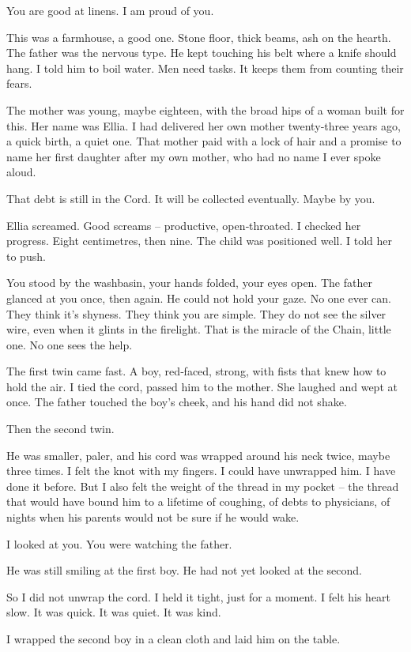 \documentclass[10pt,twoside]{book}
\begin{document}
You are good at linens. I am proud of you.

This was a farmhouse, a good one. Stone floor, thick beams, ash on the hearth. The father was the nervous type. He kept touching his belt where a knife should hang. I told him to boil water. Men need tasks. It keeps them from counting their fears.

The mother was young, maybe eighteen, with the broad hips of a woman built for this. Her name was Ellia. I had delivered her own mother twenty‑three years ago, a quick birth, a quiet one. That mother paid with a lock of hair and a promise to name her first daughter after my own mother, who had no name I ever spoke aloud.

That debt is still in the Cord. It will be collected eventually. Maybe by you.

Ellia screamed. Good screams – productive, open‑throated. I checked her progress. Eight centimetres, then nine. The child was positioned well. I told her to push.

You stood by the washbasin, your hands folded, your eyes open. The father glanced at you once, then again. He could not hold your gaze. No one ever can. They think it's shyness. They think you are simple. They do not see the silver wire, even when it glints in the firelight. That is the miracle of the Chain, little one. No one sees the help.

The first twin came fast. A boy, red‑faced, strong, with fists that knew how to hold the air. I tied the cord, passed him to the mother. She laughed and wept at once. The father touched the boy's cheek, and his hand did not shake.

Then the second twin.

He was smaller, paler, and his cord was wrapped around his neck twice, maybe three times. I felt the knot with my fingers. I could have unwrapped him. I have done it before. But I also felt the weight of the thread in my pocket – the thread that would have bound him to a lifetime of coughing, of debts to physicians, of nights when his parents would not be sure if he would wake.

I looked at you. You were watching the father.

He was still smiling at the first boy. He had not yet looked at the second.

So I did not unwrap the cord. I held it tight, just for a moment. I felt his heart slow. It was quick. It was quiet. It was kind.

I wrapped the second boy in a clean cloth and laid him on the table.
\end{document}
